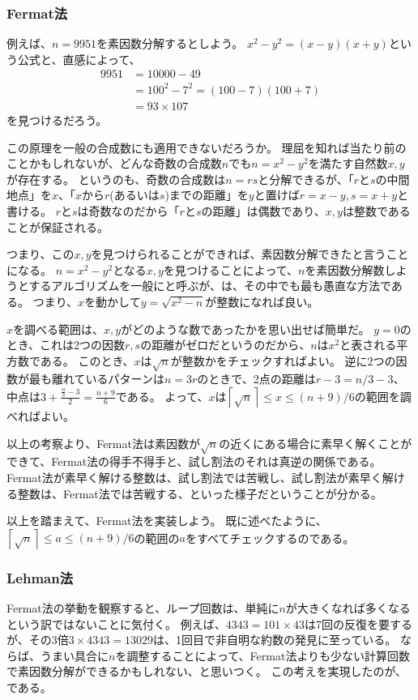 \subsubsection{Fermat法}
例えば、$n=9951$を素因数分解するとしよう。
$x^2-y^2 = (x-y)(x+y)$という公式と、直感によって、
\begin{align*}
9951 &= 10000 - 49\\
&= 100^2 - 7^2 = (100 - 7)(100 + 7)\\
&= 93 \times 107
\end{align*}
を見つけるだろう。

この原理を一般の合成数にも適用できないだろうか。
理屈を知れば当たり前のことかもしれないが、どんな奇数の合成数$n$でも$n=x^2-y^2$を満たす自然数$x,y$が存在する。
というのも、奇数の合成数は$n=rs$と分解できるが、「$r$と$s$の中間地点」を$x$、「$x$から$r$(あるいは$s$)までの距離」を$y$と置けば$r=x-y,s=x+y$と書ける。
$r$と$s$は奇数なのだから「$r$と$s$の距離」は偶数であり、$x,y$は整数であることが保証される。

つまり、この$x,y$を見つけられることができれば、素因数分解できたと言うことになる。
$n=x^2-y^2$となる$x,y$を見つけることによって、$n$を素因数分解数しようとするアルゴリズムを一般にと呼ぶが、は、その中でも最も愚直な方法である。
つまり、$x$を動かして$y=\sqrt{x^2-n}$が整数になれば良い。

$x$を調べる範囲は、$x,y$がどのような数であったかを思い出せば簡単だ。
$y=0$のとき、これは2つの因数$r,s$の距離がゼロだというのだから、$n$は$x^2$と表される平方数である。
このとき、$x$は$\sqrt{n}$が整数かをチェックすればよい。
逆に2つの因数が最も離れているパターンは$n=3r$のときで、2点の距離は$r-3=n/3-3$、中点は$3+\frac{\frac{n}{3}-3}{2}=\frac{n+9}{6}$である。
よって、$x$は$\left \lceil\sqrt{n}\right \rceil\le x \le (n + 9) / 6$の範囲を調べればよい。

以上の考察より、Fermat法は素因数が$\sqrt{n}$の近くにある場合に素早く解くことができて、Fermat法の得手不得手と、試し割法のそれは真逆の関係である。
Fermat法が素早く解ける整数は、試し割法では苦戦し、試し割法が素早く解ける整数は、Fermat法では苦戦する、といった様子だということが分かる。

以上を踏まえて、Fermat法を実装しよう。
既に述べたように、$\left \lceil\sqrt{n}\right \rceil \le a \le (n + 9) / 6$の範囲の$a$をすべてチェックするのである。


\subsubsection{Lehman法}
Fermat法の挙動を観察すると、ループ回数は、単純に$n$が大きくなれば多くなるという訳ではないことに気付く。
例えば、$4343=101\times43$は7回の反復を要するが、その3倍$3\times4343=13029$は、1回目で非自明な約数の発見に至っている。
ならば、うまい具合に$n$を調整することによって、Fermat法よりも少ない計算回数で素因数分解ができるかもしれない、と思いつく。
この考えを実現したのが、である。

